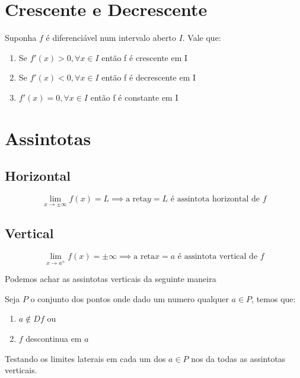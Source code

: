 \section{Crescente e Decrescente}

\begin{theorem}
    Suponha \(f\) é diferenciável num intervalo aberto \(I\). Vale que:
    \begin{enumerate}
        \item Se \(f'(x) > 0, \forall x  \in I\) então f é crescente em I
        \item Se \(f'(x) < 0, \forall x  \in I\) então f é decrescente em I
        \item \(f'(x) = 0, \forall x  \in I\) então f é constante em I
    \end{enumerate}
\end{theorem}

\section{Assintotas}

\subsection{Horizontal}

\begin{definition}
    \begin{equation}
        \lim_{x \to \pm \infty} f(x) = L \implies \text{a reta} y = L \text{ é assintota horizontal de \(f\)}
    \end{equation}
\end{definition}

\subsection{Vertical}

\begin{definition}
    \begin{equation}
        \lim_{x \to a^{\pm}} f(x) = \pm \infty \implies \text{a reta} x = a \text{ é assintota vertical de \(f\)}
    \end{equation}
\end{definition}
Podemos achar as assintotas verticais da seguinte maneira
\begin{method}
    Seja \(P\) o conjunto dos pontos onde dado um numero qualquer \( a \in P\), temos que:
    \begin{enumerate}
        \item \(a \notin Df\) ou
        \item \(f\) descontinua em \(a\)
    \end{enumerate}
    Testando os limites laterais em cada um dos \( a \in P\) nos da todas as assintotas verticais.
\end{method}

